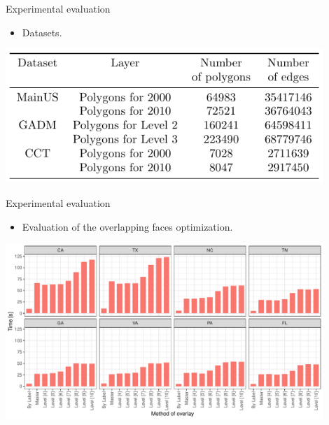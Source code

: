     \begin{frame}{Experimental evaluation}
        \begin{itemize}
            \item Datasets.
        \end{itemize}
        \vspace{1cm}
        \centering
        \includegraphics[width=0.9\textwidth]{figures/sdcel_datasets}
    \end{frame}

    \begin{frame}{Experimental evaluation}
        \begin{itemize}
            \item Evaluation of the overlapping faces optimization.
        \end{itemize}
        \vspace{5mm}
        \centering
        \includegraphics[width=0.9\textwidth]{../thesis/chapterSDCEL/OverlayTester/Overlay_Tester}
    \end{frame}

